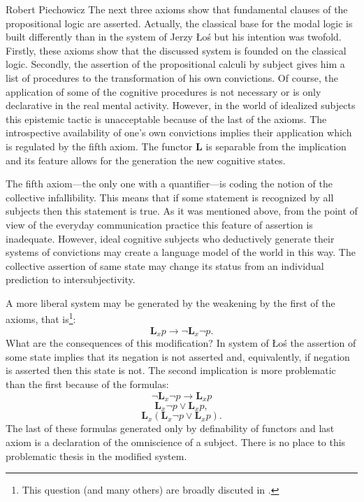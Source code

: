 \begin{artengenv}{Robert Piechowicz}
The next three axioms show that fundamental clauses of the propositional logic are asserted. Actually, the classical base for the modal logic is built differently than in the system of Jerzy \L{}o\'{s} but his intention was twofold. Firstly, these axioms show that the discussed system is founded on the classical logic. Secondly, the assertion of the propositional calculi by subject gives him a list of procedures to the transformation of his own convictions. Of course, the application of some of the cognitive procedures is not necessary or is only declarative in the real mental activity. However, in the world of idealized subjects this epistemic tactic is unacceptable because of the last of the axioms. The introspective availability of one's own convictions implies their application which is regulated by the fifth axiom. The functor $\mathbf{L}$ is separable from the implication and its feature allows for the generation the new cognitive states.

The fifth axiom---the only one with a quantifier---is coding the notion of the collective infallibility. This means that if some statement is recognized by all subjects then this statement is true. As it was mentioned above, from the point of view of the everyday communication practice this feature of assertion is inadequate.  However, ideal cognitive subjects who deductively generate their systems of convictions may create a language model of the world in this way. The collective assertion of same state may change its status from an individual prediction to intersubjectivity.

A more liberal system may be generated by the weakening by the first of the axioms, that is\footnote{This question (and many others) are broadly discuted in
\parencites[][pp.254-264]{lechniak_przekonania_2011}[][pp.75-88]{marciszewski_podstawy_1972}.}:
$$\mathbf{L}_{x}p\rightarrow \neg \mathbf{L}_{x}\neg p.$$
What are the consequences of this modification? In system of \L{}o\'{s} the assertion of some state implies that its negation is not asserted and, equivalently, if negation is asserted then this state is not. The second implication is more problematic than the first because of the formulas:
$$\neg \mathbf{L}_{x}\neg p\rightarrow  \mathbf{L}_{x} p$$
$$\mathbf{L}_{x}\neg p\vee \mathbf{L}_{x}p,$$
$$\mathbf{L}_{x}(\mathbf{L}_{x}\neg p\vee \mathbf{L}_{x}p).$$
The last of these formulas generated only by definability of functors and last axiom is a declaration of the omniscience of a subject. There is no place to this problematic thesis in the modified system.


\end{artengenv}
